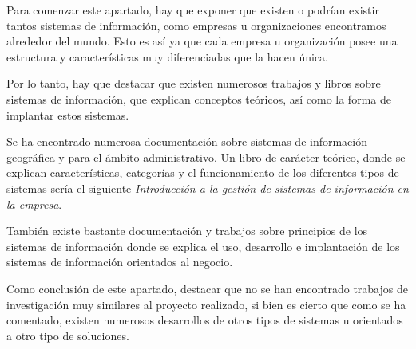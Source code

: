 
Para comenzar este apartado, hay que exponer que existen o podrían existir tantos sistemas de información, como empresas u organizaciones encontramos alrededor del mundo. 
Esto es así ya que cada empresa u organización posee una estructura y características muy diferenciadas que la hacen única.

Por lo tanto, hay que destacar que existen numerosos trabajos y libros sobre sistemas de información, que explican conceptos teóricos, así como la forma de implantar estos sistemas.  

Se ha encontrado numerosa documentación sobre sistemas de información geográfica y para el ámbito administrativo. Un libro de carácter teórico, donde se explican características, categorías y el funcionamiento de los diferentes tipos de sistemas sería el siguiente \emph{Introducción a la gestión de sistemas de información en la empresa}\cite{trabajos}.


También existe bastante documentación y trabajos sobre principios de los sistemas de información donde se explica el uso, desarrollo e implantación de los sistemas de información orientados al negocio\cite{effy}.

Como conclusión de este apartado, destacar que no se han encontrado trabajos de investigación muy similares al proyecto realizado, si bien es cierto que como se ha comentado, existen numerosos desarrollos de otros tipos de sistemas u orientados a otro tipo de soluciones.